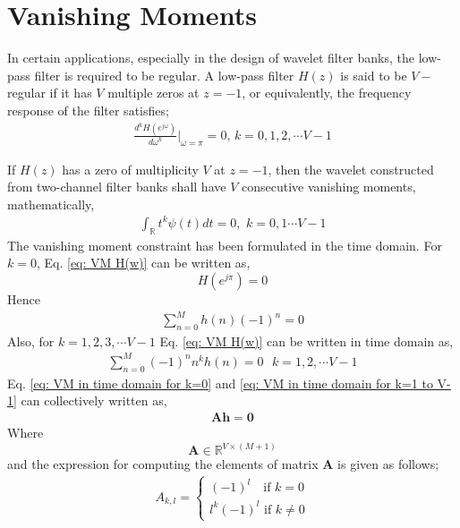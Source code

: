 \section{Vanishing Moments}
\label{sec: VM}
In certain applications, especially in the design of wavelet filter
banks, the low-pass filter is required to be regular. A low-pass filter
$H(z)$ is said to be $V-$regular if it has $V$ multiple zeros
at $z=-1$, or equivalently, the frequency response of the filter
satisfies;
\begin{eqnarray}
\label{eq: VM H(w)}
 \frac{d^{k}H(e^{j\omega})}{d\omega^{k}}\Bigg|_{\omega=\pi}=0,\, k=0,1,2,\cdots V-1 
\end{eqnarray}

If $H(z)$ has a zero of multiplicity $V$ at $z=-1$, then the
wavelet constructed from two-channel filter banks shall have $V$
consecutive vanishing moments, mathematically,
\begin{eqnarray}
\label{eq: regular PSI(t) }
\int_{\mathbb{R}}t^{k}\psi(t)dt=0,\,\, k=0,1\cdots V-1
\end{eqnarray} 
The vanishing moment constraint has been formulated in the time domain. For $k=0$, Eq. \ref{eq: VM H(w)} can be written as,
$$H(e^{j\pi}) = 0$$
Hence
\begin{eqnarray}
\label{eq: VM in time domain for k=0}
\sum_{n=0}^{M} h(n)(-1)^n = 0
\end{eqnarray}
Also, for $k=1,2,3,\cdots V-1$  Eq. \ref{eq: VM H(w)} can be written in time domain as,
\begin{eqnarray}
\label{eq: VM in time domain for k=1 to V-1}
\sum_{n=0}^{M}(-1)^n{n^k}h(n)=0 \,\,\,\, k = 1,2, \cdots V-1
\end{eqnarray} 
Eq. \ref{eq: VM in time domain for k=0} and \ref{eq: VM in time domain for k=1 to V-1} can collectively written as,
\begin{eqnarray}
\label{eq: VM in liner form}
\mathbf{Ah = 0}
\end{eqnarray}
Where $$\mathbf{A} \in \mathbb{R}^{V \times (M+1)}$$  and the expression for computing the elements of matrix $\mathbf{A}$ is given as follows;
\begin{eqnarray}
\label{eq: VM Matrix}
A_{k,l} =
\begin{cases}
 (-1)^l\,\,\,\,\,\, \text{if}\,\, k = 0 \\
 {l^k}(-1)^l \,\, \text{if}\,\, k \neq 0
\end{cases}
\end{eqnarray}
